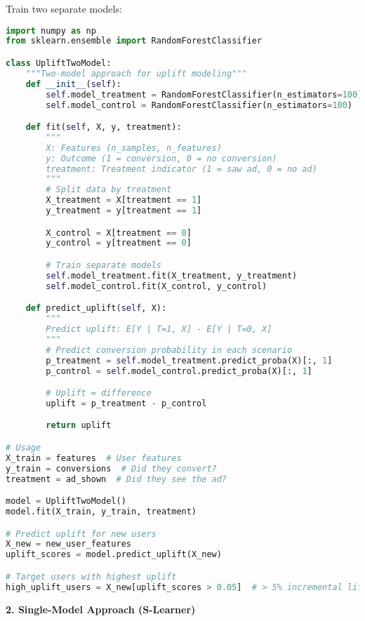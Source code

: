 \documentclass[10pt]{article}
\begin{document}
Train two separate models:
\begin{lstlisting}[language=Python]
import numpy as np
from sklearn.ensemble import RandomForestClassifier

class UpliftTwoModel:
    """Two-model approach for uplift modeling"""
    def __init__(self):
        self.model_treatment = RandomForestClassifier(n_estimators=100)
        self.model_control = RandomForestClassifier(n_estimators=100)

    def fit(self, X, y, treatment):
        """
        X: Features (n_samples, n_features)
        y: Outcome (1 = conversion, 0 = no conversion)
        treatment: Treatment indicator (1 = saw ad, 0 = no ad)
        """
        # Split data by treatment
        X_treatment = X[treatment == 1]
        y_treatment = y[treatment == 1]

        X_control = X[treatment == 0]
        y_control = y[treatment == 0]

        # Train separate models
        self.model_treatment.fit(X_treatment, y_treatment)
        self.model_control.fit(X_control, y_control)

    def predict_uplift(self, X):
        """
        Predict uplift: E[Y | T=1, X] - E[Y | T=0, X]
        """
        # Predict conversion probability in each scenario
        p_treatment = self.model_treatment.predict_proba(X)[:, 1]
        p_control = self.model_control.predict_proba(X)[:, 1]

        # Uplift = difference
        uplift = p_treatment - p_control

        return uplift

# Usage
X_train = features  # User features
y_train = conversions  # Did they convert?
treatment = ad_shown  # Did they see the ad?

model = UpliftTwoModel()
model.fit(X_train, y_train, treatment)

# Predict uplift for new users
X_new = new_user_features
uplift_scores = model.predict_uplift(X_new)

# Target users with highest uplift
high_uplift_users = X_new[uplift_scores > 0.05]  # > 5% incremental lift
\end{lstlisting}

\textbf{2. Single-Model Approach (S-Learner)}
\end{document}
